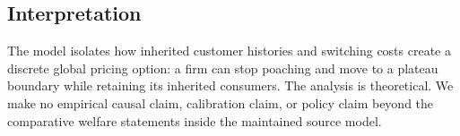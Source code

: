 \subsection{Interpretation}

The model isolates how inherited customer histories and switching costs create a discrete global pricing option: a firm can stop poaching and move to a plateau boundary while retaining its inherited consumers. The analysis is theoretical. We make no empirical causal claim, calibration claim, or policy claim beyond the comparative welfare statements inside the maintained source model.
